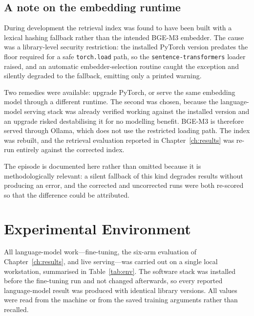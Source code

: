 \subsection{A note on the embedding runtime}

During development the retrieval index was found to have been built with a
lexical hashing fallback rather than the intended BGE-M3 embedder. The cause was
a library-level security restriction: the installed PyTorch version predates the
floor required for a safe \texttt{torch.load} path, so the
\texttt{sentence-transformers} loader raised, and an automatic embedder-selection
routine caught the exception and silently degraded to the fallback, emitting only
a printed warning.

Two remedies were available: upgrade PyTorch, or serve the same embedding model
through a different runtime. The second was chosen, because the language-model
serving stack was already verified working against the installed version and an
upgrade risked destabilising it for no modelling benefit. BGE-M3 is therefore
served through Ollama, which does not use the restricted loading path. The index
was rebuilt, and the retrieval evaluation reported in Chapter~\ref{ch:results}
was re-run entirely against the corrected index.

The episode is documented here rather than omitted because it is
methodologically relevant: a silent fallback of this kind degrades results
without producing an error, and the corrected and uncorrected runs were both
re-scored so that the difference could be attributed.

\section{Experimental Environment}
\label{sec:env}

All language-model work---fine-tuning, the six-arm evaluation of
Chapter~\ref{ch:results}, and live serving---was carried out on a single local
workstation, summarised in Table~\ref{tab:env}. The software stack was installed
before the fine-tuning run and not changed afterwards, so every reported
language-model result was produced with identical library versions. All values
were read from the machine or from the saved training arguments rather than
recalled.

